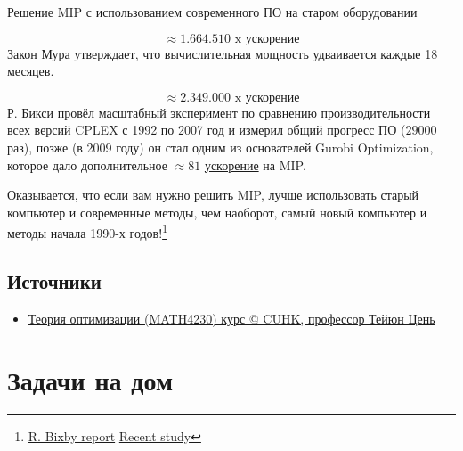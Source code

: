 \documentclass[
  russian,
  letterpaper,
  DIV=11,
  numbers=noendperiod]{scrartcl}
\providecommand{\tightlist}{%
  \setlength{\itemsep}{0pt}\setlength{\parskip}{0pt}}
\begin{document}
\begin{tcolorbox}[enhanced jigsaw, coltitle=black, arc=.35mm, titlerule=0mm, colbacktitle=quarto-callout-caution-color!10!white, bottomrule=.15mm, bottomtitle=1mm, colback=white, opacitybacktitle=0.6, breakable, opacityback=0, colframe=quarto-callout-caution-color-frame, toprule=.15mm, toptitle=1mm, rightrule=.15mm, title=\textcolor{quarto-callout-caution-color}{\faFire}\hspace{0.5em}{Программное обеспечение}, leftrule=.75mm, left=2mm]

Решение MIP с использованием современного ПО на старом оборудовании

\end{tcolorbox}

\[
\approx 1.664.510\text{ x ускорение}
\] Закон Мура утверждает, что вычислительная мощность удваивается каждые
18 месяцев.

\[
\approx 2.349.000\text{ x ускорение}
\] Р. Бикси провёл масштабный эксперимент по сравнению
производительности всех версий CPLEX с 1992 по 2007 год и измерил общий
прогресс ПО (\(29 000\) раз), позже (в 2009 году) он стал одним из
основателей Gurobi Optimization, которое дало дополнительное
\(\approx 81\)
\href{https://www.gurobi.com/features/gurobi-optimizer-delivers-unmatched-performance/}{ускорение}
на MIP.

Оказывается, что если вам нужно решить MIP, лучше использовать старый
компьютер и современные методы, чем наоборот, самый новый компьютер и
методы начала 1990-х годов!\footnote{\href{https://www.math.uni-bielefeld.de/documenta/vol-ismp/25_bixby-robert.pdf}{R.
  Bixby report} \href{https://plato.asu.edu/talks/japan23.pdf}{Recent
  study}}

\subsection{Источники}\label{ux438ux441ux442ux43eux447ux43dux438ux43aux438}

\begin{itemize}
\tightlist
\item
  \href{https://www.math.cuhk.edu.hk/course_builder/1920/math4230/Lagrangeduality-example.pdf}{Теория
  оптимизации (MATH4230) курс @ CUHK, профессор Тейюн Цень}
\end{itemize}

\section{Задачи на
дом}\label{ux437ux430ux434ux430ux447ux438-ux43dux430-ux434ux43eux43c}
\end{document}
